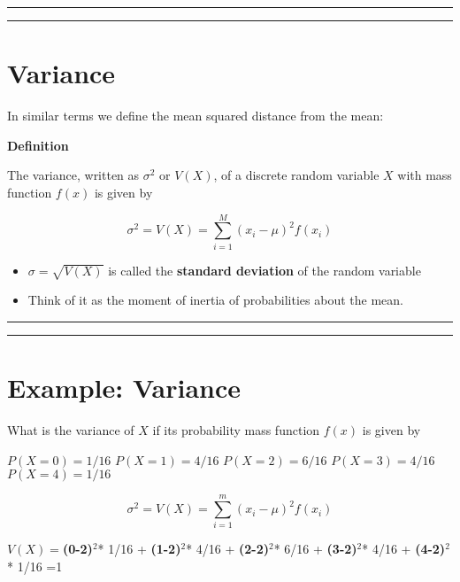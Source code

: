 \documentclass[
]{book}
\begin{document}
\begin{center}\rule{0.5\linewidth}{0.5pt}\end{center}

\begin{center}\rule{0.5\linewidth}{0.5pt}\end{center}

\hypertarget{variance}{%
\section{Variance}\label{variance}}

In similar terms we define the mean squared distance from the mean:

\textbf{Definition}

The variance, written as \(\sigma^2\) or \(V(X)\), of a discrete random variable \(X\) with mass function \(f(x)\) is given by

\[\sigma^2 = V(X)= \sum_{i=1}^M (x_i-\mu)^2 f(x_i)\]

\begin{itemize}
\item
  \(\sigma=\sqrt{V(X)}\) is called the \textbf{standard deviation} of the random variable
\item
  Think of it as the moment of inertia of probabilities about the mean.
\end{itemize}

\begin{center}\rule{0.5\linewidth}{0.5pt}\end{center}

\begin{center}\rule{0.5\linewidth}{0.5pt}\end{center}

\hypertarget{example-variance}{%
\section{Example: Variance}\label{example-variance}}

What is the variance of \(X\) if its probability mass function \(f(x)\) is given by

\(P(X=0)=1/16\)
\(P(X=1)=4/16\)
\(P(X=2)=6/16\)
\(P(X=3)=4/16\)
\(P(X=4)=1/16\)

\[\sigma^2 =V(X)=\sum_{i=1}^m (x_i-\mu)^2 f(x_i)\]

\(V(X)=\)\textbf{(0-2)}\(^2\)* 1/16 + \textbf{(1-2)}\(^2\)* 4/16 + \textbf{(2-2)}\(^2\)* 6/16 + \textbf{(3-2)}\(^2\)* 4/16 + \textbf{(4-2)}\(^2\)* 1/16 =1
\end{document}
